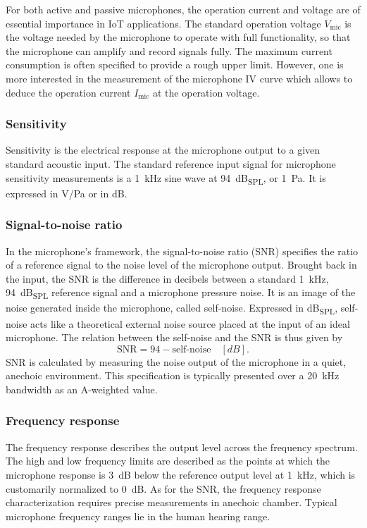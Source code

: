 \documentclass{EPL-master-thesis-covers-EN}
\newcommand{\te}[1]{\textrm{#1}}
\begin{document}
For both active and passive microphones, the operation current and voltage are of essential importance in IoT applications. The standard operation voltage $V_{\te{mic}}$ is the voltage needed by the microphone to operate with full functionality, so that the microphone can amplify and record signals fully. The maximum current consumption is often specified to provide a rough upper limit. However, one is more interested in the measurement of the microphone IV curve which allows to deduce the operation current $I_{\te{mic}}$ at the operation voltage.

\subsubsection*{Sensitivity}

Sensitivity is the electrical response at the microphone output to a given standard acoustic input. The standard reference input signal for microphone sensitivity measurements is a \SI{1}{kHz} sine wave at \SI{94}{dB_{SPL}}, or \SI{1}{Pa}. It is expressed in \si{V/Pa} or in \si{dB}.

\subsubsection*{Signal-to-noise ratio}

In the microphone's framework, the signal-to-noise ratio (SNR) specifies the ratio of a reference signal to the noise level of the microphone output. Brought back in the input, the SNR is the difference in decibels between a standard \SI{1}{kHz}, \SI{94}{dB_{SPL}} reference signal and a microphone pressure noise. It is an image of the noise generated inside the microphone, called self-noise. Expressed in \si{dB_{SPL}}, self-noise acts like a theoretical external noise source placed at the input of an ideal microphone. The relation between the self-noise and the SNR is thus given by
\[
 \te{SNR} = 94 - \te{self-noise} \quad \si{[dB]}.
\]
SNR is calculated by measuring the noise output of the microphone in a quiet, anechoic environment. This specification is typically presented over a \SI{20}{kHz} bandwidth as an A-weighted value.

\subsubsection*{Frequency response}

The frequency response describes the output level across the frequency spectrum. The high and low frequency limits are described as the points at which the microphone response is \SI{3}{dB} below the reference output level at \SI{1}{kHz}, which is customarily normalized to \SI{0}{dB}. As for the SNR, the frequency response characterization requires precise measurements in anechoic chamber. Typical microphone frequency ranges lie in the human hearing range.
\end{document}
